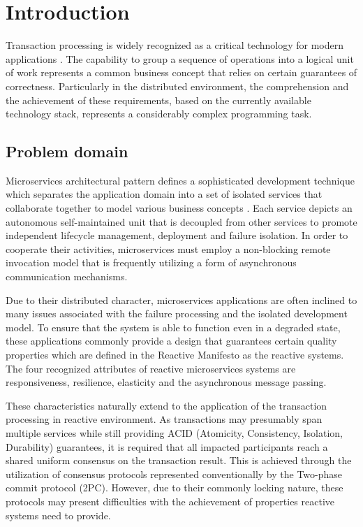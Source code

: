 \documentclass[oneside,
  digital, %
  table,   %
  lof,     %
  lot,     %
]{fithesis3}
\begin{document}
\chapter{Introduction}

Transaction processing is widely recognized as a critical technology for modern applications \cite{java_tran_processing}. The capability to group a sequence of operations into a logical unit of work represents a common business concept that relies on certain guarantees of correctness. Particularly in the distributed environment, the comprehension and the achievement of these requirements, based on the currently available technology stack, represents a considerably complex programming task.

\section{Problem domain}

Microservices architectural pattern defines a sophisticated development technique which separates the application domain into a set of isolated services that collaborate together to model various business concepts \cite{building_ms}. Each service depicts an autonomous self-maintained unit that is decoupled from other services to promote independent lifecycle management, deployment and failure isolation. In order to cooperate their activities, microservices must employ a non-blocking remote invocation model that is frequently utilizing a form of asynchronous communication mechanisms.

Due to their distributed character, microservices applications are often inclined to many issues associated with the failure processing and the isolated development model. To ensure that the system is able to function even in a degraded state, these applications commonly provide a design that guarantees certain quality properties which are defined in the Reactive Manifesto \cite{reactive_manifesto} as the reactive systems. The four recognized attributes of reactive microservices systems are responsiveness, resilience, elasticity and the asynchronous message passing.

These characteristics naturally extend to the application of the transaction processing in reactive environment. As transactions may presumably span multiple services while still providing ACID (Atomicity, Consistency, Isolation, Durability) guarantees, it is required that all impacted participants reach a shared uniform consensus on the transaction result. This is achieved through the utilization of consensus protocols represented conventionally by the Two-phase commit protocol (2PC). However, due to their commonly locking nature, these protocols may present difficulties with the achievement of properties reactive systems need to provide.
\end{document}
